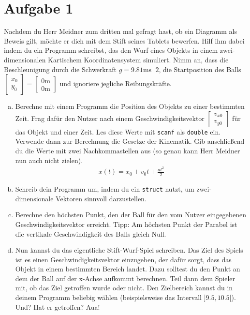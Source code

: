 \documentclass{standalone}
\begin{document}
\section{Aufgabe 1}
    Nachdem du Herr Meidner zum dritten mal gefragt hast, ob ein Diagramm als Beweis gilt, möchte er dich mit dem Stift seines Tablets bewerfen. Hilf ihm dabei indem du ein Programm schreibst, das den Wurf eines Objekts in einem zwei-dimensionalen Kartischem Koordinatensystem simuliert. Nimm an, dass die Beschleunigung durch die Schwerkraft $g=9.81\text{ms}^-2$, die Startposition des Balls $\begin{bmatrix}x_0\\y_0\end{bmatrix}=\begin{bmatrix}0\text{m}\\0\text{m}\end{bmatrix}$ und ignoriere jegliche Reibungskräfte.

\begin{enumerate}[a)]
\item
    Berechne mit einem Programm die Position des Objekts zu einer bestimmten Zeit. Frag  dafür den Nutzer nach einem Geschwindigkeitsvektor $\begin{bmatrix}v_{x0}\\v_{y0}\end{bmatrix}$ für das Objekt und einer Zeit. Les diese Werte mit \texttt{scanf} als \texttt{double} ein. Verwende dann zur Berechnung die Gesetze der Kinematik. Gib anschließend du die Werte mit zwei Nachkommastellen aus (so genau kann Herr Meidner nun auch nicht zielen).
    \begin{align*}
        x(t)=x_0+v_0t+\frac{at^2}{2}
    \end{align*}

\item
    Schreib dein Programm um, indem du ein \texttt{struct} nutzt, um zwei-dimensionale Vektoren sinnvoll darzustellen.

\item
    Berechne den höchsten Punkt, den der Ball für den vom Nutzer eingegebenen Geschwindigkeitsvektor erreicht. Tipp: Am höchsten Punkt der Parabel ist die vertikale Geschwindigkeit des Balls gleich Null.

\item
    Nun kannst du das eigentliche Stift-Wurf-Spiel schreiben. Das Ziel des Spiels ist es einen Geschwindigkeitsvektor einzugeben, der dafür sorgt, dass das Objekt in einem bestimmten Bereich landet. Dazu solltest du den Punkt an dem der Ball auf der x-Achse aufkommt berechnen. Teil dann dem Spieler mit, ob das Ziel getroffen wurde oder nicht. Den Zielbereich kannst du in deinem Programm beliebig wählen (beispielsweise das Intervall $]9.5,10.5[$). Und? Hat er getroffen? Aua!

\end{enumerate}
\end{document}
